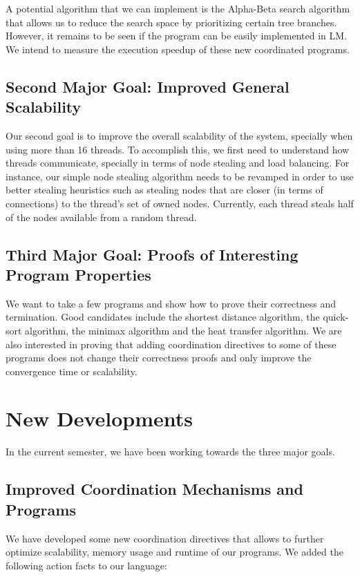 \documentclass[10pt]{article}
\begin{document}
A potential algorithm that we can implement is the Alpha-Beta search algorithm
that allows us to reduce the search space by prioritizing certain tree branches.
However, it remains to be seen if the program can be easily implemented in LM.
We intend to measure the execution speedup of these new coordinated programs.

\subsection{Second Major Goal: Improved General Scalability}

Our second goal is to improve the overall scalability of the system, specially
when using more than 16 threads. To accomplish this, we first need to understand
how threads communicate, specially in terms of node stealing and load balancing.
For instance, our simple node stealing algorithm needs to be revamped in order
to use better stealing heuristics such as stealing nodes that are closer (in
terms of connections) to the thread's set of owned nodes. Currently, each
thread steals half of the nodes available from a random thread.

\subsection{Third Major Goal: Proofs of Interesting Program Properties}

We want to take a few programs and show how to prove their correctness and
termination.  Good candidates include the shortest distance
algorithm, the quick-sort algorithm, the minimax algorithm and the heat transfer
algorithm. We are also interested in proving that adding coordination directives
to some of these programs does not change their correctness proofs and only
improve the convergence time or scalability.

\section{New Developments}

In the current semester, we have been working towards the three major goals.

\subsection{Improved Coordination Mechanisms and Programs}

We have developed some new coordination directives that allows to further
optimize scalability, memory usage and runtime of our programs. We added the
following action facts to our language:
\end{document}
